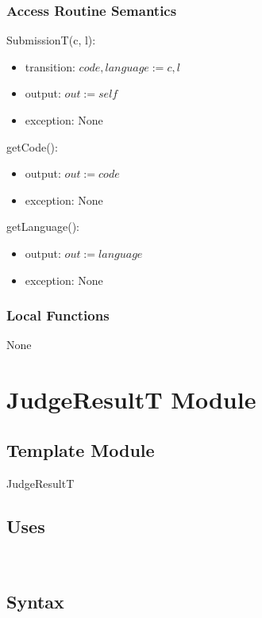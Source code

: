 \documentclass[12pt, titlepage]{article}
\begin{document}
\subsubsection{Access Routine Semantics}

\noindent SubmissionT(c, l):
\begin{itemize}
\item transition: $code, language := c, l$
\item output: $out := self$
\item exception: None
\end{itemize}

\noindent getCode():
\begin{itemize}
\item output: $out := code$
\item exception: None
\end{itemize}

\noindent getLanguage():
\begin{itemize}
\item output: $out := language$
\item exception: None
\end{itemize}

\subsubsection{Local Functions}
None

\newpage

\section{JudgeResultT Module} \label{JudgeResultT} 

\subsection{Template Module}

JudgeResultT

\subsection{Uses}

\\

\subsection{Syntax}
\end{document}
